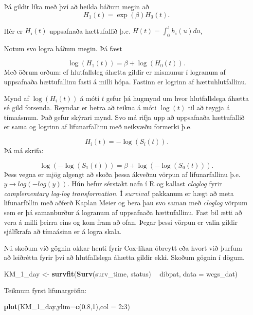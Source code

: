 \documentclass[
]{book}
\newenvironment{Shaded}{\begin{snugshade}}{\end{snugshade}}
\newcommand{\DataTypeTok}[1]{\textcolor[rgb]{0.13,0.29,0.53}{#1}}
\newcommand{\DecValTok}[1]{\textcolor[rgb]{0.00,0.00,0.81}{#1}}
\newcommand{\FloatTok}[1]{\textcolor[rgb]{0.00,0.00,0.81}{#1}}
\newcommand{\KeywordTok}[1]{\textcolor[rgb]{0.13,0.29,0.53}{\textbf{#1}}}
\newcommand{\NormalTok}[1]{#1}
\newcommand{\OperatorTok}[1]{\textcolor[rgb]{0.81,0.36,0.00}{\textbf{#1}}}
\newcommand{\StringTok}[1]{\textcolor[rgb]{0.31,0.60,0.02}{#1}}
\begin{document}
Þá gildir líka með því að heilda báðum megin að
\[
H_1(t) = \exp(\beta)H_0(t).
\]

Hér er \(H_i(t)\) uppsafnaða hættufallið þ.e. \(H(t) = \int_0^t h_i(u)du\),

Notum svo logra báðum megin. Þá fæst

\[
\log(H_1(t)) = \beta + \log(H_0(t)).
\]
Með öðrum orðum: ef hlutfallsleg áhætta gildir er mismunur í logranum af uppsafnaða hættufallinu fasti á milli hópa. Fastinn er logrinn af hættuhlutfallinu.

Mynd af \(\log(H_i(t))\) á móti \(t\) gefur þá hugmynd um hvor hlutfallslega áhætta sé gild forsenda. Reyndar er betra að teikna á móti \(\log(t)\) til að teygja á tímaásnum. Það gefur skýrari mynd. Svo má rifja upp að uppsafnaða hættufallið er sama og logrinn af lifunarfallinu með neikvæðu formerki þ.e.

\[
H_i(t) = -\log(S_i(t)).
\]
Þá má skrifa:

\[
\log(-\log(S_1(t))) = \beta + \log(-\log(S_0(t))).
\]
Þess vegna er mjög algengt að skoða þessa ákveðnu vörpun af lifunarfallinu þ.e. \(y \to log(-log(y))\). Hún hefur sérstakt nafn í R og kallast \emph{cloglog} fyrir \emph{complementary log-log transformation}. Í \(survival\) pakkanum er hægt að meta lifunarföllin með aðferð Kaplan Meier og bera þau svo saman með \emph{cloglog} vörpum sem er þá samanburður á logranum af uppsafnaða hættufallinu. Fast bil ætti að vera á milli þeirra eins og kom fram að ofan. Þegar þessi vörpun er valin gildir sjálfkrafa að tímaásinn er á logra skala.

Nú skoðum við gögnin okkar henti fyrir Cox-líkan óbreytt eða hvort við þurfum að leiðrétta fyrir því að hlutfallslega áhætta gildir ekki. Skoðum gögnin í dögum.

\begin{Shaded}
\begin{Highlighting}[]
\NormalTok{KM_}\DecValTok{1}\NormalTok{_day <-}\StringTok{ }\KeywordTok{survfit}\NormalTok{(}\KeywordTok{Surv}\NormalTok{(surv_time, status) }\OperatorTok{~}\StringTok{ }\NormalTok{dibpat, }\DataTypeTok{data =}\NormalTok{ wcgs_dat)}
\end{Highlighting}
\end{Shaded}

Teiknum fyrst lifunargröfin:

\begin{Shaded}
\begin{Highlighting}[]
\KeywordTok{plot}\NormalTok{(KM_}\DecValTok{1}\NormalTok{_day,}\DataTypeTok{ylim=}\KeywordTok{c}\NormalTok{(}\FloatTok{0.8}\NormalTok{,}\DecValTok{1}\NormalTok{),}\DataTypeTok{col =} \DecValTok{2}\OperatorTok{:}\DecValTok{3}\NormalTok{)}
\end{Highlighting}
\end{Shaded}
\end{document}
